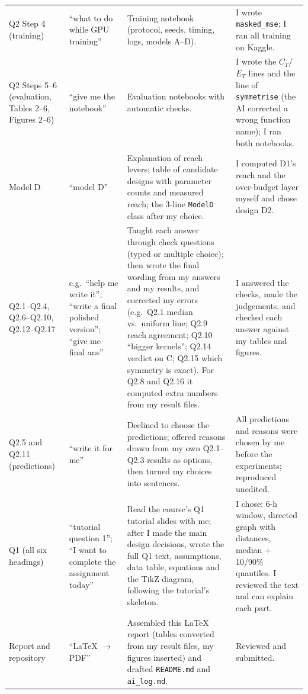 \begin{longtable}{@{}p{2.5cm}p{4.3cm}p{5.0cm}p{4.0cm}@{}}
Q2 Step 4 (training) & ``what to do while GPU training'' & Training notebook (protocol, seeds, timing, logs, models A--D). & I wrote \texttt{masked\_mse}; I ran all training on Kaggle. \\
Q2 Steps 5--6 (evaluation, Tables 2--6, Figures 2--6) & ``give me the notebook'' & Evaluation notebooks with automatic checks. & I wrote the $C_T$/$E_T$ lines and the line of \texttt{symmetrise} (the AI corrected a wrong function name); I ran both notebooks. \\
Model D & ``model D'' & Explanation of reach levers; table of candidate designs with parameter counts and measured reach; the 3-line \texttt{ModelD} class after my choice. & I computed D1's reach and the over-budget layer myself and chose design D2. \\
Q2.1--Q2.4, Q2.6--Q2.10, Q2.12--Q2.17 & e.g.\ ``help me write it''; ``write a final polished version''; ``give me final ans'' & Taught each answer through check questions (typed or multiple choice); then wrote the final wording from my answers and my results, and corrected my errors (e.g.\ Q2.1 median vs.\ uniform line; Q2.9 reach agreement; Q2.10 ``bigger kernels''; Q2.14 verdict on C; Q2.15 which symmetry is exact). For Q2.8 and Q2.16 it computed extra numbers from my result files. & I answered the checks, made the judgements, and checked each answer against my tables and figures. \\
Q2.5 and Q2.11 (predictions) & ``write it for me'' & Declined to choose the predictions; offered reasons drawn from my own Q2.1--Q2.3 results as options, then turned my choices into sentences. & All predictions and reasons were chosen by me before the experiments; reproduced unedited. \\
Q1 (all six headings) & ``tutorial question 1''; ``I want to complete the assignment today'' & Read the course's Q1 tutorial slides with me; after I made the main design decisions, wrote the full Q1 text, assumptions, data table, equations and the TikZ diagram, following the tutorial's skeleton. & I chose: 6-h window, directed graph with distances, median + 10/90\% quantiles. I reviewed the text and can explain each part. \\
Report and repository & ``LaTeX $\to$ PDF'' & Assembled this LaTeX report (tables converted from my result files, my figures inserted) and drafted \texttt{README.md} and \texttt{ai\_log.md}. & Reviewed and submitted. \\
\bottomrule
\end{longtable}
\normalsize
